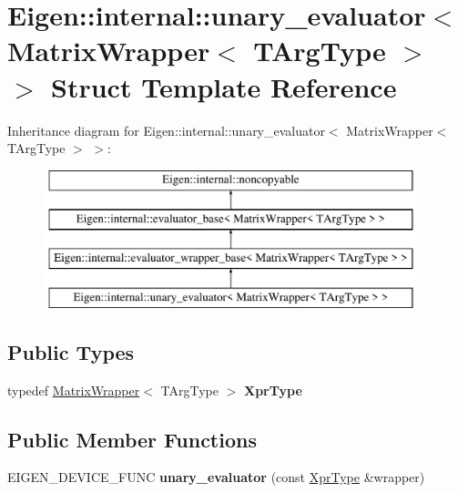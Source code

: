 \hypertarget{struct_eigen_1_1internal_1_1unary__evaluator_3_01_matrix_wrapper_3_01_t_arg_type_01_4_01_4}{}\section{Eigen\+::internal\+::unary\+\_\+evaluator$<$ Matrix\+Wrapper$<$ T\+Arg\+Type $>$ $>$ Struct Template Reference}
\label{struct_eigen_1_1internal_1_1unary__evaluator_3_01_matrix_wrapper_3_01_t_arg_type_01_4_01_4}
Inheritance diagram for Eigen\+::internal\+::unary\+\_\+evaluator$<$ Matrix\+Wrapper$<$ T\+Arg\+Type $>$ $>$\+:\begin{figure}[H]
\begin{center}
\leavevmode
\includegraphics[height=4.000000cm]{struct_eigen_1_1internal_1_1unary__evaluator_3_01_matrix_wrapper_3_01_t_arg_type_01_4_01_4}
\end{center}
\end{figure}
\subsection*{Public Types}
\begin{DoxyCompactItemize}
\item 
\mbox{\label{struct_eigen_1_1internal_1_1unary__evaluator_3_01_matrix_wrapper_3_01_t_arg_type_01_4_01_4_aad78899b387a72ae42afbf13dc006efa}} 
typedef \mbox{\hyperlink{class_eigen_1_1_matrix_wrapper}{Matrix\+Wrapper}}$<$ T\+Arg\+Type $>$ {\bfseries Xpr\+Type}
\end{DoxyCompactItemize}
\subsection*{Public Member Functions}
\begin{DoxyCompactItemize}
\item 
\mbox{\label{struct_eigen_1_1internal_1_1unary__evaluator_3_01_matrix_wrapper_3_01_t_arg_type_01_4_01_4_a435ca48ac98cc82112eab0a2b74a978c}} 
E\+I\+G\+E\+N\+\_\+\+D\+E\+V\+I\+C\+E\+\_\+\+F\+U\+NC {\bfseries unary\+\_\+evaluator} (const \mbox{\hyperlink{class_eigen_1_1_matrix_wrapper}{Xpr\+Type}} \&wrapper)
\end{DoxyCompactItemize}
